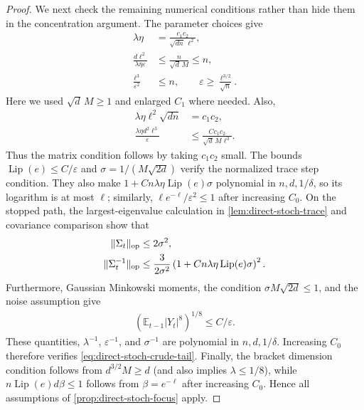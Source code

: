 \documentclass{article}
\theoremstyle{plain}
\theoremstyle{definition}
\theoremstyle{plain}
\newcommand{\E}{\mathbb E}
\begin{document}
\begin{proof}
    We next check the remaining numerical conditions rather than hide
    them in the concentration argument.  The parameter choices give
    \begin{align}
        \lambda\eta
         & =\frac{c_1c_2}{\sqrt{dn}\,\ell^2},
        \label{eq:direct-stoch-lambda-eta}
        \\
        \frac{d\ell^2}{\lambda\eta\varepsilon}
         & \leq\frac{n}{\sqrt d\,M}\leq n,
        \\
        \frac{\ell^3}{\varepsilon^2}
         & \leq n,
        \qquad
        \varepsilon\geq\frac{\ell^{3/2}}{\sqrt n}.
        \label{eq:direct-stoch-moment-checks}
    \end{align}
    Here we used $\sqrt d\,M\geq1$ and enlarged $C_1$ where needed.
    Also,
    \begin{align}
        \lambda\eta\ell^2\sqrt{dn}
         & =c_1c_2,
        \\
        \frac{\lambda\eta d^2\ell^3}{\varepsilon}
         & \leq\frac{C c_1c_2}{\sqrt d\,M\ell^3}.
        \label{eq:direct-stoch-matrix-checks}
    \end{align}
    Thus the matrix condition follows by taking $c_1c_2$ small.
    The bounds $\operatorname{Lip}(e)\leq C/\varepsilon$ and
    $\sigma=1/(M\sqrt{2d})$ verify the normalized trace step condition.
    They also make
    $1+Cn\lambda\eta\operatorname{Lip}(e)\sigma$ polynomial in
    $n,d,1/\delta$, so its logarithm is at most $\ell$; similarly,
    $\ell e^{-\ell}/\varepsilon^2\leq1$ after increasing $C_0$.
    On the stopped path, the largest-eigenvalue calculation in
    \cref{lem:direct-stoch-trace} and covariance comparison show that
    \begin{align}
        \|\Sigma_t\|_{\rm op} & \leq2\sigma^2,
        \\
        \|\Sigma_t^{-1}\|_{\rm op}
                              & \leq
        \frac{3}{2\sigma^2}
        \left(
        1+Cn\lambda\eta\operatorname{Lip}(e)\sigma
        \right)^2.
    \end{align}
    Furthermore, Gaussian Minkowski moments, the condition
    $\sigma M\sqrt{2d}\leq1$, and the noise assumption give
    \begin{align}
        \left(\E_{t-1}|Y_t|^8\right)^{1/8}
        \leq C/\varepsilon.
    \end{align}
    These quantities, $\lambda^{-1}$, $\varepsilon^{-1}$, and
    $\sigma^{-1}$ are polynomial in $n,d,1/\delta$.  Increasing $C_0$
    therefore verifies \eqref{eq:direct-stoch-crude-tail}.
    Finally, the bracket dimension condition follows from
    $d^{3/2}M\geq d$ (and also implies $\lambda\leq1/8$), while
    $n\operatorname{Lip}(e)d\beta\leq1$ follows from
    $\beta=e^{-\ell}$ after increasing $C_0$.  Hence all assumptions
    of \cref{prop:direct-stoch-focus} apply.


\end{proof}
\end{document}

